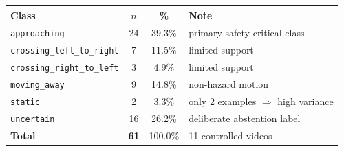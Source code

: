 \begin{tabular}{lccl}
\toprule
Class & $n$ & \% & Note \\
\midrule
\texttt{approaching} & 24 & 39.3\% & primary safety-critical class \\
\texttt{crossing\_left\_to\_right} & 7 & 11.5\% & limited support \\
\texttt{crossing\_right\_to\_left} & 3 & 4.9\% & limited support \\
\texttt{moving\_away} & 9 & 14.8\% & non-hazard motion \\
\texttt{static} & 2 & 3.3\% & only 2 examples $\Rightarrow$ high variance \\
\texttt{uncertain} & 16 & 26.2\% & deliberate abstention label \\
\midrule
\textbf{Total} & \textbf{61} & 100.0\% & 11 controlled videos \\
\bottomrule
\end{tabular}
